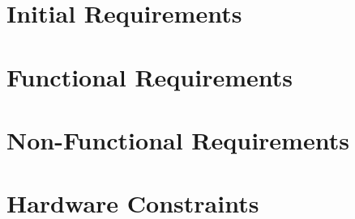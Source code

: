 \section{Initial Requirements}
\label{initial_requirements}


\section{Functional Requirements}
\label{functional_requirements}


\section{Non-Functional Requirements}
\label{non_functional_requirements}


\section{Hardware Constraints}
\label{hardware_constraints}

